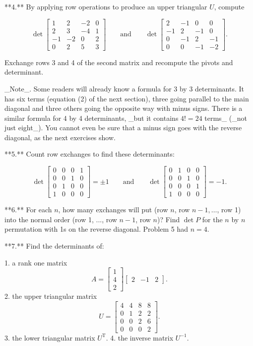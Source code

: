 

**4.** By applying row operations to produce an upper triangular \(U\), compute

\[\det\left[\begin{matrix}1&2&-2&0\\ 2&3&-4&1\\ -1&-2&0&2\\ 0&2&5&3\end{matrix}\right]\qquad\text{and}\qquad\det\left[\begin{matrix}2&-1&0&0 \\ -1&2&-1&0\\ 0&-1&2&-1\\ 0&0&-1&-2\end{matrix}\right].\]

Exchange rows 3 and 4 of the second matrix and recompute the pivots and determinant.

_Note_. Some readers will already know a formula for 3 by 3 determinants. It has six terms (equation (2) of the next section), three going parallel to the main diagonal and three others going the opposite way with minus signs. There is a similar formula for 4 by 4 determinants, _but it contains \(4!=24\) terms_ (_not just eight_). You cannot even be sure that a minus sign goes with the reverse diagonal, as the next exercises show.

**5.** Count row exchanges to find these determinants:

\[\det\left[\begin{matrix}0&0&0&1\\ 0&0&1&0\\ 0&1&0&0\\ 1&0&0&0\end{matrix}\right]=\pm 1\qquad\text{and}\qquad\det\left[\begin{matrix}0&1&0&0 \\ 0&0&1&0\\ 0&0&0&1\\ 1&0&0&0\end{matrix}\right]=-1.\]

**6.** For each \(n\), how many exchanges will put (row \(n\), row \(n-1,\dots\), row 1) into the normal order (row 1, ..., row \(n-1\), row \(n\))? Find \(\det P\) for the \(n\) by \(n\) permutation with 1s on the reverse diagonal. Problem 5 had \(n=4\).

**7.** Find the determinants of:

1. a rank one matrix \[A=\begin{bmatrix}1\\ 4\\ 2\end{bmatrix}\begin{bmatrix}2&-1&2\end{bmatrix}.\]
2. the upper triangular matrix \[U=\begin{bmatrix}4&4&8&8\\ 0&1&2&2\\ 0&0&2&6\\ 0&0&0&2\end{bmatrix}.\]
3. the lower triangular matrix \(U^{\mathrm{T}}\).
4. the inverse matrix \(U^{-1}\).

